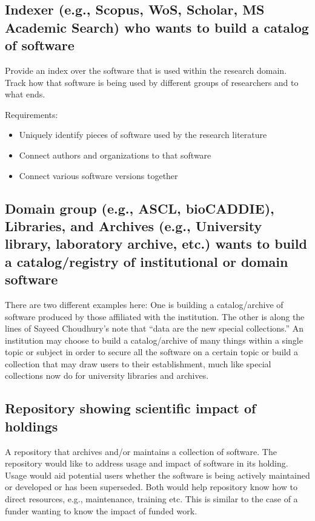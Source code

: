 \documentclass[12pt, oneside]{amsart}
\begin{document}
\subsection{Indexer (e.g., Scopus, WoS, Scholar, MS Academic Search) who wants to build a catalog of software}

Provide an index over the software that is used within the research domain. Track how that software is being used by different groups of researchers and to what ends.

Requirements:
\begin{itemize}
\item Uniquely identify pieces of software used by the research literature
\item Connect authors and organizations to that software
\item Connect various software versions together
\end{itemize}

\subsection{Domain group (e.g., ASCL, bioCADDIE), Libraries, and Archives (e.g., University library, laboratory archive, etc.) wants to build a catalog\slash registry of institutional or domain software}

There are two different examples here: One is building a catalog/archive of software produced by those affiliated with the institution.
The other is along the lines of Sayeed Choudhury's note that ``data are the new special collections.''
An institution may choose to build a catalog/archive of many things within a single topic or subject in order to secure all the software on a certain topic or build a collection that may draw users to their establishment, much like special collections now do for university libraries and archives.

\subsection{Repository showing scientific impact of holdings}

A repository that archives and/or maintains a collection of software.
The repository would like to address usage and impact of software in its holding.
Usage would aid potential users whether the software is being actively maintained or developed or has been superseded.
Both would help repository know how to direct resources, e.g., maintenance, training etc.
This is similar to the case of a funder wanting to know the impact of funded work.
\end{document}
